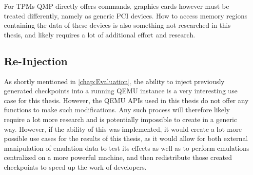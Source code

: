For TPMs QMP directly offers commands, graphics cards however must be treated differently, namely as generic PCI devices.
How to access memory regions containing the data of these devices is also something not researched in this thesis,
and likely requires a lot of additional effort and research.

\subsection{Re-Injection}\label{sec:injection}
As shortly mentioned in \autoref{chap:Evaluation},
the ability to inject previously generated checkpoints into a running QEMU instance is a very interesting use case for this thesis.
However, the QEMU APIs used in this thesis do not offer any functions to make such modifications.
Any such process will therefore likely require a lot more research and is potentially impossible to create in a generic way.
However, if the ability of this was implemented,
it would create a lot more possible use cases for the results of this thesis,
as it would allow for both external manipulation of emulation data to test its effects
as well as to perform emulations centralized on a more powerful machine,
and then redistribute those created checkpoints to speed up the work of developers.